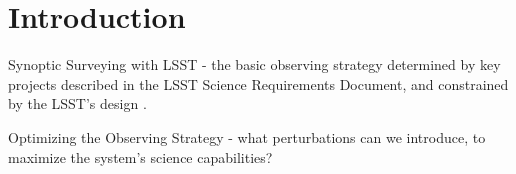 
\chapter[Introduction]{Introduction}
\label{chp:intro}


Synoptic Surveying with LSST - the basic observing strategy determined
by key projects described in the LSST Science Requirements Document,
and constrained by the LSST's design \citep{IvezicEtal2008}.

Optimizing the Observing Strategy - what perturbations can we
introduce, to maximize the system's science capabilities?

